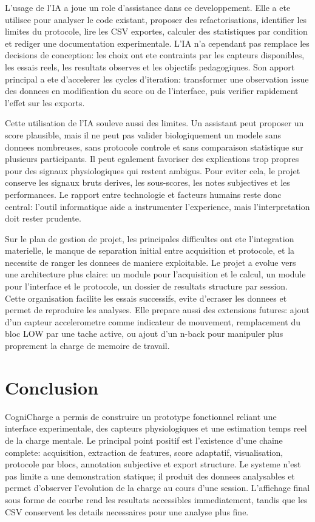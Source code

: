 \documentclass[runningheads]{llncs}
\begin{document}
L'usage de l'IA a joue un role d'assistance dans ce developpement. Elle a ete utilisee pour analyser le code existant, proposer des refactorisations, identifier les limites du protocole, lire les CSV exportes, calculer des statistiques par condition et rediger une documentation experimentale. L'IA n'a cependant pas remplace les decisions de conception: les choix ont ete contraints par les capteurs disponibles, les essais reels, les resultats observes et les objectifs pedagogiques. Son apport principal a ete d'accelerer les cycles d'iteration: transformer une observation issue des donnees en modification du score ou de l'interface, puis verifier rapidement l'effet sur les exports.

Cette utilisation de l'IA souleve aussi des limites. Un assistant peut proposer un score plausible, mais il ne peut pas valider biologiquement un modele sans donnees nombreuses, sans protocole controle et sans comparaison statistique sur plusieurs participants. Il peut egalement favoriser des explications trop propres pour des signaux physiologiques qui restent ambigus. Pour eviter cela, le projet conserve les signaux bruts derives, les sous-scores, les notes subjectives et les performances. Le rapport entre technologie et facteurs humains reste donc central: l'outil informatique aide a instrumenter l'experience, mais l'interpretation doit rester prudente.

Sur le plan de gestion de projet, les principales difficultes ont ete l'integration materielle, le manque de separation initial entre acquisition et protocole, et la necessite de ranger les donnees de maniere exploitable. Le projet a evolue vers une architecture plus claire: un module pour l'acquisition et le calcul, un module pour l'interface et le protocole, un dossier de resultats structure par session. Cette organisation facilite les essais successifs, evite d'ecraser les donnees et permet de reproduire les analyses. Elle prepare aussi des extensions futures: ajout d'un capteur accelerometre comme indicateur de mouvement, remplacement du bloc LOW par une tache active, ou ajout d'un n-back pour manipuler plus proprement la charge de memoire de travail.

\section{Conclusion}

CogniCharge a permis de construire un prototype fonctionnel reliant une interface experimentale, des capteurs physiologiques et une estimation temps reel de la charge mentale. Le principal point positif est l'existence d'une chaine complete: acquisition, extraction de features, score adaptatif, visualisation, protocole par blocs, annotation subjective et export structure. Le systeme n'est pas limite a une demonstration statique; il produit des donnees analysables et permet d'observer l'evolution de la charge au cours d'une session. L'affichage final sous forme de courbe rend les resultats accessibles immediatement, tandis que les CSV conservent les details necessaires pour une analyse plus fine.
\end{document}
